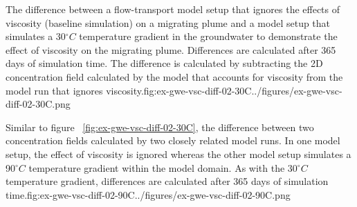 \begin{StandardFigure}{
   The difference between a flow-transport model setup that ignores the effects of viscosity (baseline simulation) on a migrating plume and a model setup that simulates a 30$^{\circ}C$ temperature gradient in the groundwater to demonstrate the effect of viscosity on the migrating plume.  Differences are calculated after 365 days of simulation time.  The difference is calculated by subtracting the 2D concentration field calculated by the model that accounts for viscosity from the model run that ignores viscosity.}{fig:ex-gwe-vsc-diff-02-30C}{../figures/ex-gwe-vsc-diff-02-30C.png}
\end{StandardFigure}

\begin{StandardFigure}{
   Similar to figure ~\ref{fig:ex-gwe-vsc-diff-02-30C}, the difference between two concentration fields calculated by two closely related model runs.  In one model setup, the effect of viscosity is ignored whereas the other model setup simulates a 90$^{\circ}C$ temperature gradient within the model domain.  As with the 30$^{\circ}C$ temperature gradient, differences are calculated after 365 days of simulation time.}{fig:ex-gwe-vsc-diff-02-90C}{../figures/ex-gwe-vsc-diff-02-90C.png}
\end{StandardFigure}
